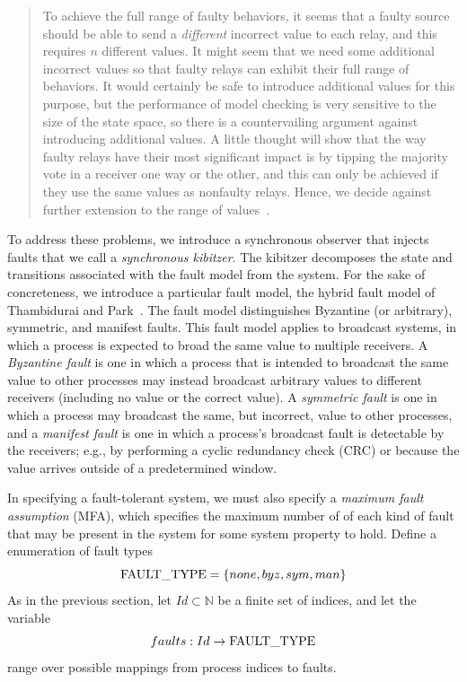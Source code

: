 \documentclass{llncs/llncs}
\begin{document}
\begin{quote}
To achieve the full range of faulty behaviors, it seems that a faulty source should be able to send a \emph{different} incorrect value to each relay, and this requires $n$ different values. It might seem that we need some additional incorrect values so that faulty relays can exhibit their full range of behaviors. It would certainly be safe to introduce additional values for this purpose, but the performance of model checking is very sensitive to the size of the state space, so there is a countervailing argument against introducing additional values. A little thought will show that the way faulty relays have their most significant impact is by tipping the majority vote in a receiver one way or the other, and this can only be achieved if they use the same values as nonfaulty relays. Hence, we decide against further extension to the range of values~\cite{}.
\end{quote}

To address these problems, we introduce a synchronous observer that injects faults that we call a \emph{synchronous kibitzer}. The kibitzer decomposes the state and transitions associated with the fault model from the system. For the sake of concreteness, we introduce a particular fault model, the hybrid fault model of Thambidurai and Park~\cite{}. The fault model distinguishes Byzantine (or arbitrary), symmetric, and manifest faults. This fault model applies to broadcast systems, in which a process is expected to broad the same value to multiple receivers. A \emph{Byzantine fault} is one in which a process that is intended to broadcast the same value to other processes may instead broadcast arbitrary values to different receivers (including no value or the correct value). A \emph{symmetric fault} is one in which a process may broadcast the same, but incorrect, value to other processes, and a \emph{manifest fault} is one in which a process's broadcast fault is detectable by the receivers; e.g., by performing a cyclic redundancy check (CRC) or because the value arrives outside of a predetermined window.

In specifying a fault-tolerant system, we must also specify a \emph{maximum fault assumption} (MFA), which specifies the maximum number of of each kind of fault that may be present in the system for some system property to hold. Define a enumeration of fault types $$\textnormal{FAULT\_TYPE} = \{none, byz, sym, man\}$$ As in the previous section, let $Id \subset \mathbb{N}$ be a finite set of indices, and let the variable $$faults: Id \rightarrow \textnormal{FAULT\_TYPE}$$ range over possible mappings from process indices to faults.
\end{document}

